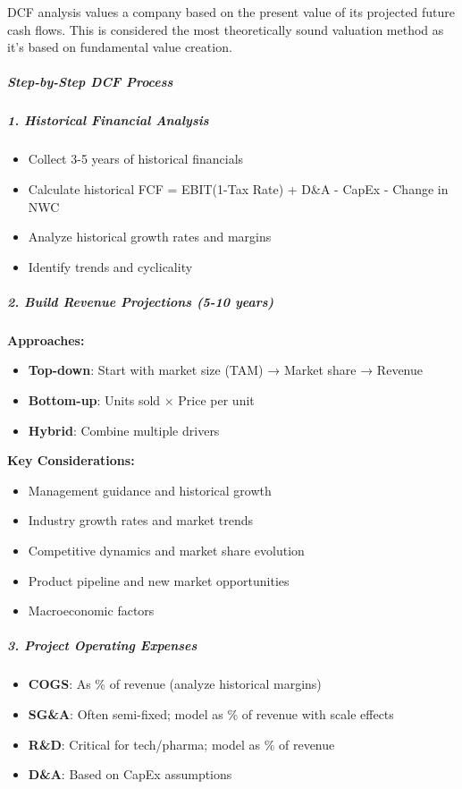 \documentclass[11pt]{article}
\begin{document}
DCF analysis values a company based on the present value of its projected future cash flows. This is considered the most theoretically sound valuation method as it's based on fundamental value creation.


\subparagraph{Step-by-Step DCF Process}\mbox{}\par

\subparagraph{1. Historical Financial Analysis}\mbox{}\par
\begin{itemize}[leftmargin=*,itemsep=2pt,topsep=2pt]
\item {} Collect 3-5 years of historical financials
\item {} Calculate historical FCF = EBIT(1-Tax Rate) + D\&A - CapEx - Change in NWC
\item {} Analyze historical growth rates and margins
\item {} Identify trends and cyclicality
\end{itemize}

\subparagraph{2. Build Revenue Projections (5-10 years)}\mbox{}\par
\textbf{Approaches:}

\begin{itemize}[leftmargin=*,itemsep=2pt,topsep=2pt]
\item {} \textbf{Top-down}: Start with market size (TAM) → Market share → Revenue
\item {} \textbf{Bottom-up}: Units sold × Price per unit
\item {} \textbf{Hybrid}: Combine multiple drivers
\end{itemize}

\textbf{Key Considerations:}

\begin{itemize}[leftmargin=*,itemsep=2pt,topsep=2pt]
\item {} Management guidance and historical growth
\item {} Industry growth rates and market trends
\item {} Competitive dynamics and market share evolution
\item {} Product pipeline and new market opportunities
\item {} Macroeconomic factors
\end{itemize}

\subparagraph{3. Project Operating Expenses}\mbox{}\par
\begin{itemize}[leftmargin=*,itemsep=2pt,topsep=2pt]
\item {} \textbf{COGS}: As \% of revenue (analyze historical margins)
\item {} \textbf{SG\&A}: Often semi-fixed; model as \% of revenue with scale effects
\item {} \textbf{R\&D}: Critical for tech/pharma; model as \% of revenue
\item {} \textbf{D\&A}: Based on CapEx assumptions
\end{itemize}
\end{document}

